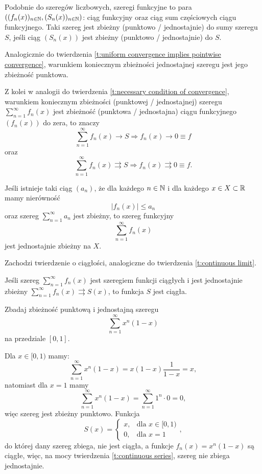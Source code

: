 Podobnie do szeregów liczbowych, szeregi funkcyjne to para $((f_n(x))_{n\in\mathbb N}, (S_n(x))_{n\in\mathbb N})$: ciąg funkcyjny oraz ciąg sum częściowych ciągu funkcyjnego. Taki szereg jest zbieżny (punktowo / jednostajnie) do sumy szeregu $S$, jeśli ciąg $(S_n(x))$ jest zbieżny (punktowo / jednostajnie) do $S$.

Analogicznie do twierdzenia \ref{t:uniform convergence implies pointwise convergence}, warunkiem koniecznym zbieżności jednostajnej szeregu jest jego zbieżność punktowa.

Z kolei w analogii do twierdzenia \ref{t:necessary condition of convergence}, warunkiem koniecznym zbieżności (punktowej / jednostajnej) szeregu $\sum_{n=1}^\infty f_n(x)$ jest zbieżność (punktowa / jednostajna) ciągu funkcyjnego $(f_n(x))$ do zera, to znaczy
\[ \sum_{n=1}^\infty f_n(x) \rightarrow S \Longrightarrow f_n(x) \rightarrow 0 \equiv f \]
oraz
\[ \sum_{n=1}^\infty f_n(x) \rightrightarrows S \Longrightarrow f_n(x) \rightrightarrows 0 \equiv f. \]

\begin{theorem}
    Jeśli istnieje taki ciąg $(a_n)$, że dla każdego $n \in \mathbb N$ i dla każdego $x \in X \subset \mathbb R$ mamy nierówność
    \[ |f_n(x)| \leq a_n \]
    oraz szereg $\sum_{n=1}^\infty a_n$ jest zbieżny, to szereg funkcyjny
    \[ \sum_{n=1}^\infty f_n(x) \]
    jest jednostajnie zbieżny na $X$.
\end{theorem}

Zachodzi twierdzenie o ciągłości, analogiczne do twierdzenia \ref{t:continuous limit}.

\begin{theorem}
    \label{t:continuous series}
    Jeśli szereg $\sum_{n=1}^\infty f_n(x)$ jest szeregiem funkcji ciągłych i jest jednostajnie zbieżny $\sum_{n=1}^\infty f_n(x) \rightrightarrows S(x)$, to funkcja $S$ jest ciągła.
\end{theorem}

\begin{example}
    Zbadaj zbieżność punktową i jednostajną szeregu
    \[ \sum_{n=1}^\infty x^n(1-x) \]
    na przedziale $[0,1]$.
\end{example}
\begin{solution}
    Dla $x \in [0, 1)$ mamy:
    \[ \sum_{n=1}^\infty x^n(1-x) = x(1-x)\frac{1}{1-x} = x, \]
    natomiast dla $x = 1$ mamy
    \[ \sum_{n=1}^\infty x^n(1-x) = \sum_{n=1}^\infty 1^n \cdot 0 = 0, \]
    więc szereg jest zbieżny punktowo. Funkcja
    \[ S(x) = \begin{cases}x, & \text{dla } x \in [0, 1) \\ 0, & \text{dla } x = 1 \end{cases}, \]
    do której dany szereg zbiega, nie jest ciągła, a funkcje $f_n(x) = x^n(1-x)$ są ciągłe, więc, na mocy twierdzenia \ref{t:continuous series}, szereg nie zbiega jednostajnie.
\end{solution}

